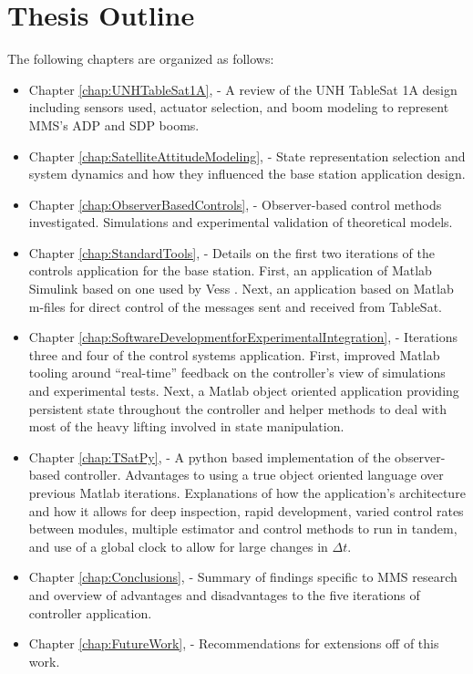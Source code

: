 \section{Thesis Outline}
\label{sec:ThesisOutline}

The following chapters are organized as follows:

\begin{itemize}
    \item Chapter \ref{chap:UNHTableSat1A},  - A review of the UNH TableSat 1A design including sensors used, actuator selection, and boom modeling to represent MMS's ADP and SDP booms.
    \item Chapter \ref{chap:SatelliteAttitudeModeling},  -  State representation selection and system dynamics and how they influenced the base station application design.
    \item Chapter \ref{chap:ObserverBasedControls},  - Observer-based control methods investigated.  Simulations and experimental validation of theoretical models.
    \item Chapter \ref{chap:StandardTools},  - Details on the first two iterations of the controls application for the base station.  First, an application of Matlab Simulink based on one used by Vess \cite{vessthesis}.  Next, an application based on Matlab m-files for direct control of the messages sent and received from TableSat.
    \item Chapter \ref{chap:SoftwareDevelopmentforExperimentalIntegration},  - Iterations three and four of the control systems application.  First, improved Matlab tooling around ``real-time'' feedback on the controller's view of simulations and experimental tests.  Next, a Matlab object oriented application providing persistent state throughout the controller and helper methods to deal with most of the heavy lifting involved in state manipulation.
    \item Chapter \ref{chap:TSatPy},  - A python based implementation of the observer-based controller.  Advantages to using a true object oriented language over previous Matlab iterations.  Explanations of how the application's architecture and how it allows for deep inspection, rapid development, varied control rates between modules, multiple estimator and control methods to run in tandem, and use of a global clock to allow for large changes in $\Delta t$.
    \item Chapter \ref{chap:Conclusions},  - Summary of findings specific to MMS research and overview of advantages and disadvantages to the five iterations of controller application.
    \item Chapter \ref{chap:FutureWork},  - Recommendations for extensions off of this work.
\end{itemize}
